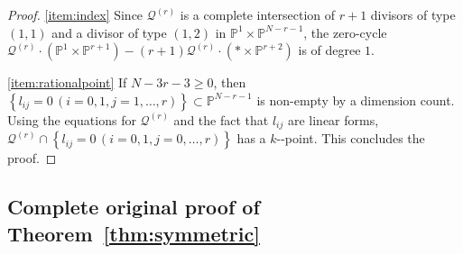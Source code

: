 \documentclass[10pt,a4paper]{amsart}
\providecommand{\nobreakdash}{\nobreak\hbox{-}}
\theoremstyle{plain}
\theoremstyle{definition}
\renewcommand\P{\mathbb{P}}
\begin{document}
\begin{proof}
\eqref{item:index}
Since $\mathcal{Q}^{(r)}$ is a complete intersection of $r+1$ divisors of type $(1,1)$ and a divisor of type $(1,2)$ in $\P^1\times \P^{N-r-1}$,
the zero-cycle $\mathcal{Q}^{(r)}\cdot (\P^1\times \P^{r+1}) - (r+1) \mathcal{Q}^{(r)}\cdot (*\times \P^{r+2})$ is of degree $1$.

\eqref{item:rationalpoint}
If $N-3r-3\geq 0$,
then $\left\{l_{ij}=0\, (i=0,1, j=1,\dots, r)\right\} \subset\P^{N-r-1}$
is non-empty by a dimension count.
Using the equations for $\mathcal{Q}^{(r)}$
and the fact that $l_{ij}$ are linear forms, $\mathcal{Q}^{(r)}\cap\left\{l_{ij}=0\, (i=0,1, j=0,\dots, r)\right\}$ has a $k$\nobreakdash-point.
This concludes the proof.
\end{proof}

\subsection{Complete original proof of Theorem~\ref{thm:symmetric}}
\end{document}
